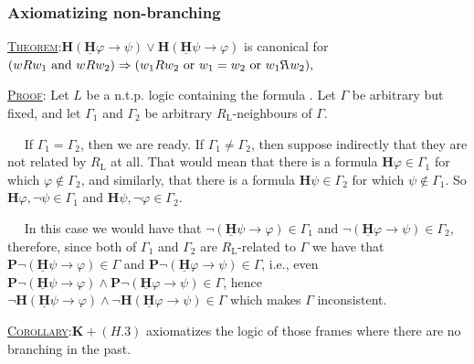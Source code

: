 \documentclass[xcolor=x11names]{beamer}
\newcommand{\bemph}[1] {{\color{DeepSkyBlue3}{#1}}}
\newcommand{\PD}{\mathbf P}
\newcommand{\PB}{\mathbf H}
\newcommand{\PBDot}{\underline{\mathbf H}}
\newcommand{\dzsa}[1]{\textsc{\underline{#1}}:}
\newcommand{\lthen}{\rightarrow}
\newcommand{\seenby}{\reflectbox {$R$}}
\begin{document}
\begin{frame}[t]
\frametitle{Axiomatizing non-branching}
\footnotesize
\dzsa{Theorem}$ \PB (\PBDot \varphi \lthen \psi) \lor \PB (\PBDot \psi \lthen \varphi)$  is canonical for $( w Rw_1\textup{ and }w R w_2) \Rightarrow  (w_1 R w_2 \textup{ or } w_1 =  w_2 \textup{ or } w_1 \seenby w_2),$

\bigskip

\dzsa{Proof} Let $L$ be a n.t.p. logic containing the formula \bemph{(H.3)}.
Let $\Gamma$ be arbitrary but fixed, and let $\Gamma_1$ and $\Gamma_2$ be arbitrary $R_{\mathrm{L}}$-neighbours of $\Gamma$.

$\quad$ If $\Gamma_1=\Gamma_2$, then we are ready.
If $\Gamma_1\neq\Gamma_2$, then suppose indirectly that they are not related by $R_{\mathrm{L}}$ at all. That would mean that there is a formula $\PB \varphi\in \Gamma_1$ for which $\varphi \notin \Gamma_2$, and similarly, that there is a formula $\PB \psi\in \Gamma_2$ for which $\psi \notin \Gamma_1$. So $\PB \varphi, \lnot \psi \in \Gamma_1$ and $\PB \psi, \lnot \varphi \in \Gamma_2$.

$\quad$ In this case we would have that $\lnot(\PBDot \psi \lthen \varphi)\in \Gamma_1$ and $\lnot(\PBDot\varphi \lthen \psi)\in \Gamma_2 $, therefore, since both of $\Gamma_1$ and $\Gamma_2$ are $R_{\mathrm{L}}$-related to $\Gamma$ we have that $\PD\lnot(\PBDot \psi \lthen \varphi)\in \Gamma$ and $\PD  \lnot(\PBDot \varphi \lthen \psi)\in \Gamma$, i.e., even $\PD \lnot(\PBDot \psi \lthen \varphi)\land \PD \lnot(\PBDot \varphi \lthen \psi)\in \Gamma$, hence
$\lnot \PB (\PBDot \psi \lthen \varphi)\land \lnot \PB (\PBDot \varphi \lthen \psi)\in \Gamma$ which makes $\Gamma$ inconsistent.

\dzsa{Corollary}$\mathbf K + (H.3)$ axiomatizes the logic of those frames where there are no branching in the past.
\end{frame}

\end{document}
